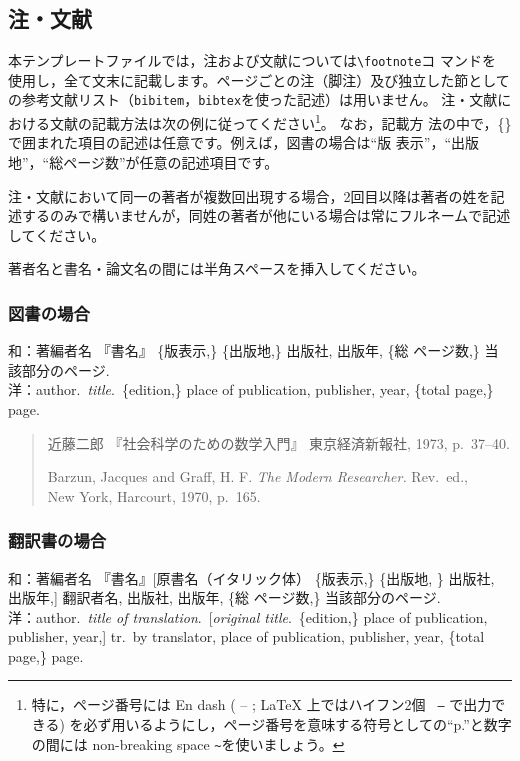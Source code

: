 \documentclass[b5paper,10pt,twocolumn,tombow]{jarticle}
\begin{document}
\subsection{注・文献} \label{123950_27Oct08}
本テンプレートファイルでは，注および文献については\verb|\footnote|コ
マンドを
使用し，全て文末に記載します。ページごとの注（脚注）及び独立した節としての参考文献リスト（\texttt{bibitem}，\texttt{bibtex}を使った記述）は用いません。
注・文献における文献の記載方法は次の例に従ってください\footnote{特に，ページ番号には En dash ( -- ; \LaTeX{} 上ではハイフン2個 \texttt{ --} で出力できる) を必ず用いるようにし，ページ番号を意味する符号としての``p.''と数字の間には non-breaking space \texttt{\~}を使いましょう。}。
なお，記載方
法の中で，\{\}で囲まれた項目の記述は任意です。例えば，図書の場合は``版
表示''，``出版地''，``総ページ数''が任意の記述項目です。

注・文献において同一の著者が複数回出現する場合，2回目以降は著者の姓を記述するのみで構いませんが，同姓の著者が他にいる場合は常にフルネームで記述してください。

著者名と書名・論文名の間には半角スペースを挿入してください。

\subsubsection{図書の場合}
\noindent{}和：著編者名 『書名』 \{版表示,\} \{出版地,\} 出版社, 出版年, \{総
\bigskip
ページ数,\} 当該部分のページ.\\
洋：author.\ \textit{title}.\ \{edition,\} place of publication,
publisher, year, \{total page,\} page.
\begin{quote}
  近藤二郎 『社会科学のための数学入門』 東京経済新報社, 1973,
  p.~37--40.

  Barzun, Jacques and Graff, H. F. \textit{The Modern Researcher.}
  Rev.\ ed., \\New York, Harcourt, 1970, p.~165.
\end{quote}


\subsubsection{翻訳書の場合}
\noindent{}和：著編者名 『書名』[原書名（イタリック体） \{版表示,\}
\{出版地, \} 出版社, 出版年,] 翻訳者名, 出版社, 出版年, \{総
\bigskip
ページ数,\} 当該部分のページ.\\
洋：author.\ \textit{title of translation}.\ [\textit{original
title}.\ \{edition,\} place of publication, publisher, year,] tr.\ by
translator, place of publication, publisher, year, \{total page,\} page.
\end{document}
